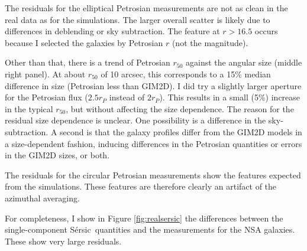 \documentclass[10pt,preprint]{aastex}
\newcommand{\Sersic}{S\'ersic}
\begin{document}
The residuals for the elliptical Petrosian measurements are not as
clean in the real data as for the simulations. The larger overall
scatter is likely due to differences in deblending or sky
subtraction. The feature at $r>16.5$ occurs because I selected the
galaxies by Petrosian $r$ (not the \citet{simard11a} magnitude). 

Other than that, there is a trend of Petrosian $r_{50}$ against the
\citet{simard11a} angular size (middle right panel). At about $r_{50}$
of 10 arcsec, this corresponds to a 15\% median difference in size
(Petrosian less than GIM2D).  I did try a slightly larger aperture for
the Petrosian flux ($2.5r_P$ instead of $2r_P$). This results in a
small (5\%) increase in the typical $r_{50}$, but without affecting
the size dependence. The reason for the residual size dependence is
unclear. One possibility is a difference in the sky-subtraction. A
second is that the galaxy profiles differ from the GIM2D models in a
size-dependent fashion, inducing differences in the Petrosian
quantities or errors in the GIM2D sizes, or both.

The residuals for the circular Petrosian measurements show the
features expected from the simulations. These features are therefore
clearly an artifact of the azimuthal averaging.

For completeness, I show in Figure \ref{fig:realsersic} the
differences between the single-component \Sersic\ quantities and the
\citet{simard11a} measurements for the NSA galaxies. These show very
large residuals.
\end{document}
